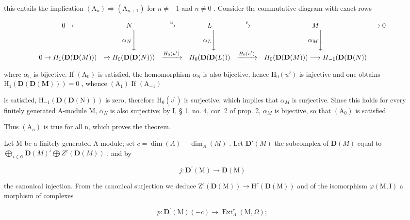 this entails the implication \((\mathrm{A}_{n})\Rightarrow(\mathrm{A}_{n+1})\) for \(n\neq-1\) and \(n\neq0\) . Consider the commutative diagram with exact rows

\[
\begin{array}{c c c c c c c} 0 \to & N & \xrightarrow {u} & L & \xrightarrow {v} & M & \to 0 \\ & \alpha_ {N} \Bigg \downarrow & & \alpha_ {L} \Bigg \downarrow & & \alpha_ {M} \Bigg \downarrow \\ 0 \to H _ {1} (\mathbf {D} (\mathbf {D} (M))) & \xrightarrow {} H _ {0} (\mathbf {D} (\mathbf {D} (N))) & \xrightarrow {H _ {0} (u ^ {\prime})} & H _ {0} (\mathbf {D} (\mathbf {D} (L))) & \xrightarrow {H _ {0} (v ^ {\prime})} & H _ {0} (\mathbf {D} (\mathbf {D} (M))) \longrightarrow H _ {- 1} (\mathbf {D} (\mathbf {D} (N)) \end{array}
\]

where \(\alpha_{\mathrm{L}}\) is bijective. If \((\mathrm{A}_0)\) is satisfied, the homomorphism \(\alpha_{\mathrm{N}}\) is also bijective, hence \(\mathrm{H}_0(u')\) is injective and one obtains \(\mathrm{H}_1(\mathbf{D}(\mathbf{D}(\mathbf{M}))) = 0\) , whence \((\mathrm{A}_1)\) If \((\mathrm{A}_{-1})\)

is satisfied, \(\mathrm{H}_{-1}(\mathbf{D}(\mathbf{D}(\mathrm{N})))\) is zero, therefore \(\mathrm{H}_{0}(v^{\prime})\) is surjective, which implies that \(\alpha_{M}\) is surjective. Since this holds for every finitely generated A-module M, \(\alpha_{N}\) is also surjective; by I, § 1, no. 4, cor. 2 of prop. 2, \(\alpha_{M}\) is bijective, so that \((\mathrm{A}_{0})\) is satisfied.

Thus \((\mathrm{A}_{n})\) is true for all n, which proves the theorem.

Let M be a finitely generated A-module; set \(c = \dim(A) - \dim_{A}(M)\) . Let \(\mathbf{D}'(M)\) the subcomplex of \(\mathbf{D}(M)\) equal to \(\bigoplus_{i\in\mathcal{O}}\mathbf{D}(M)^{i}\bigoplus Z^{c}(\mathbf{D}(M))\) , and by

\[
j: \mathbf {D} ^ {\prime} (\mathrm{M}) \rightarrow \mathbf {D} (\mathrm{M})
\]

the canonical injection. From the canonical surjection we deduce \(\mathrm{Z}^{c}(\mathbf{D}(\mathrm{M}))\to\mathrm{H}^{c}(\mathbf{D}(\mathrm{M}))\) and of the isomorphism \(\varphi(\mathrm{M},\mathrm{I})\) a morphism of complexes

\[
p: \mathbf {D} ^ {\prime} (\mathrm{M}) (- c) \rightarrow \operatorname{Ext} _ {\Lambda} ^ {c} (\mathrm{M}, \Omega);
\]

